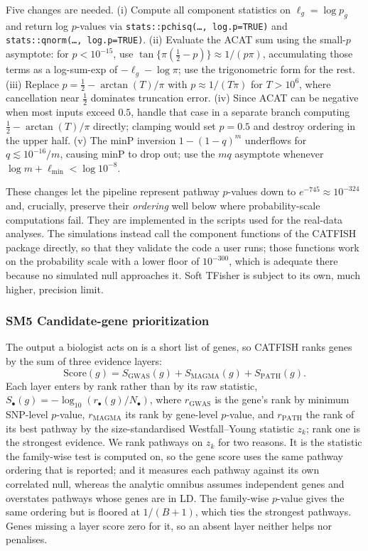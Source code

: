 Five changes are needed. (i) Compute all component statistics on $\ell_g=\log p_g$ and return log $p$-values via \texttt{stats::pchisq(\dots,\,log.p=TRUE)} and \texttt{stats::qnorm(\dots,\,log.p=TRUE)}. (ii) Evaluate the ACAT sum using the small-$p$ asymptote: for $p<10^{-15}$, use $\tan\{\pi(\tfrac12-p)\}\approx 1/(p\pi)$, accumulating those terms as a log-sum-exp of $-\ell_g-\log\pi$; use the trigonometric form for the rest. (iii) Replace $p=\tfrac12-\arctan(T)/\pi$ with $p\approx1/(T\pi)$ for $T>10^{6}$, where cancellation near $\tfrac12$ dominates truncation error. (iv) Since ACAT can be negative when most inputs exceed $0.5$, handle that case in a separate branch computing $\tfrac12-\arctan(T)/\pi$ directly; clamping would set $p=0.5$ and destroy ordering in the upper half. (v) The minP inversion $1-(1-q)^m$ underflows for $q\lesssim10^{-16}/m$, causing minP to drop out; use the $m q$ asymptote whenever $\log m+\ell_{\min}<\log 10^{-8}$.

These changes let the pipeline represent pathway $p$-values down to $e^{-745}\approx10^{-324}$ and, crucially, preserve their \emph{ordering} well below where probability-scale computations fail. They are implemented in the scripts used for the real-data analyses. The simulations instead call the component functions of the CATFISH package directly, so that they validate the code a user runs; those functions work on the probability scale with a lower floor of $10^{-300}$, which is adequate there because no simulated null approaches it. Soft TFisher is subject to its own, much higher, precision limit.

\subsubsection*{SM5 Candidate-gene prioritization}

The output a biologist acts on is a short list of genes, so CATFISH ranks genes by the sum of three evidence layers:
\[
\mathrm{Score}(g)=S_{\mathrm{GWAS}}(g)+S_{\mathrm{MAGMA}}(g)+S_{\mathrm{PATH}}(g).
\]
Each layer enters by rank rather than by its raw statistic,
$S_\bullet(g)=-\log_{10}\!\left(r_\bullet(g)/N_\bullet\right)$, where
$r_{\mathrm{GWAS}}$ is the gene's rank by minimum SNP-level $p$-value,
$r_{\mathrm{MAGMA}}$ its rank by gene-level $p$-value, and $r_{\mathrm{PATH}}$ the rank of its best pathway by the size-standardised Westfall--Young statistic $z_k$; rank one is the strongest evidence. We rank pathways on $z_k$ for two reasons. It is the statistic the family-wise test is computed on, so the gene score uses the same pathway ordering that is reported; and it measures each pathway against its own correlated null, whereas the analytic omnibus assumes independent genes and overstates pathways whose genes are in LD. The family-wise $p$-value gives the same ordering but is floored at $1/(B+1)$, which ties the strongest pathways. Genes missing a layer score zero for it, so an absent layer neither helps nor penalises.

